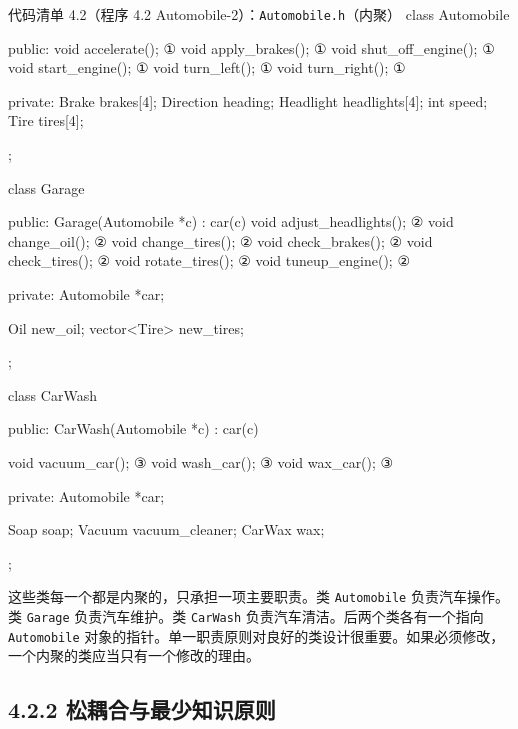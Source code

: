 \begin{codeboxt}{代码清单 4.2（程序 4.2 Automobile-2）：\texttt{Automobile.\allowbreak{}h}（内聚）}
class Automobile
{
public:
    void accelerate();                   ①
    void apply_brakes();                 ①
    void shut_off_engine();              ①
    void start_engine();                 ①
    void turn_left();                    ①
    void turn_right();                   ①

private:
    Brake brakes[4];
    Direction heading;
    Headlight headlights[4];
    int speed;
    Tire tires[4];
};

class Garage
{
public:
    Garage(Automobile *c) : car(c) {}
    void adjust_headlights();             ②
    void change_oil();                    ②
    void change_tires();                  ②
    void check_brakes();                  ②
    void check_tires();                   ②
    void rotate_tires();                  ②
    void tuneup_engine();                 ②

private:
    Automobile *car;

    Oil new_oil;
    vector<Tire> new_tires;
};

class CarWash
{
public:
    CarWash(Automobile *c) : car(c) {}

    void vacuum_car();                    ③
    void wash_car();                      ③
    void wax_car();                       ③

private:
    Automobile *car;

    Soap soap;
    Vacuum vacuum_cleaner;
    CarWax wax;
};
\end{codeboxt}
\par
{}\par
{}\par

这些类每一个都是内聚的，只承担一项主要职责。类 \texttt{Automobile} 负责汽车操作。类 \texttt{Garage} 负责汽车维护。类 \texttt{CarWash} 负责汽车清洁。后两个类各有一个指向 \texttt{Automobile} 对象的指针。单一职责原则对良好的类设计很重要。如果必须修改，一个内聚的类应当只有一个修改的理由。


\subsection{4.2.2 松耦合与最少知识原则}

